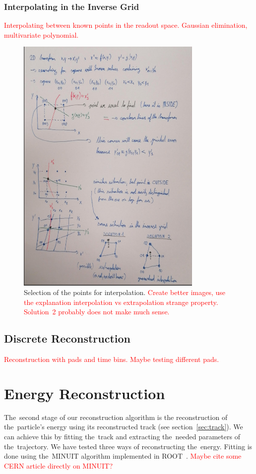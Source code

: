 \documentclass[]{article}
\begin{document}
	\subsubsection{Interpolating in the Inverse Grid}
	\textcolor{red}{Interpolating between known points in the readout space. Gaussian elimination, multivariate polynomial.}
	
	\begin{figure}
		\centering
		\includegraphics[width=0.8\textwidth]{interpol.png}
		\caption{Selection of the points for interpolation. \textcolor{red}{Create better images, use the explanation interpolation vs extrapolation strange property. Solution~2 probably does not make much sense.}}
		\label{fig:interpol}
	\end{figure}
	
	\subsection{Discrete Reconstruction}
	\textcolor{red}{Reconstruction with pads and time bins. Maybe testing different pads.}
	
	\section{Energy Reconstruction}
	\label{sec:energy}
	The~second stage of our reconstruction algorithm is the reconstruction of the~particle's energy using its reconstructed track (see section~\ref{sec:track}). We can achieve this by fitting the~track and extracting the~needed parameters of the~trajectory. We have tested three ways of reconstructing the~energy. Fitting is done using the~MINUIT algorithm implemented in ROOT~\cite{ROOT}. \textcolor{red}{Maybe cite some CERN article directly on MINUIT?}
	
\end{document}
